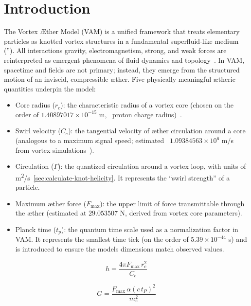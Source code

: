 \section{Introduction}

The Vortex Æther Model (VAM) is a unified framework that treats elementary particles as knotted vortex structures in a fundamental superfluid-like medium (\textquotedblright). All interactions \textendash gravity, electromagnetism, strong, and weak forces \textendash are reinterpreted as emergent phenomena of fluid dynamics and topology~\cite{VAM4}. In VAM, spacetime and fields are not primary; instead, they emerge from the structured motion of an inviscid, compressible æther. Five physically meaningful ætheric quantities underpin the model:

\begin{itemize}
    \item Core radius ($r_c$): the characteristic radius of a vortex core (chosen on the order of $1.40897017 \times 10^{-15}$ m, ~proton charge radius)~\cite{VAM4}.
    \item Swirl velocity ($C_e$): the tangential velocity of æther circulation around a core (analogous to a maximum signal speed; estimated ~$1.09384563 \times 10^6$ m/s from vortex simulations~\cite{VAM4}).
    \item Circulation ($\Gamma$): the quantized circulation around a vortex loop, with units of m\textsuperscript{2}/s~\ref{sec:calculate-knot-helicity}. It represents the ``swirl strength'' of a particle.
    \item Maximum æther force ($F_{\max}$): the upper limit of force transmittable through the æther (estimated at $29.053507$ N, derived from vortex core parameters).
    \item Planck time ($t_p$): the quantum time scale used as a normalization factor in VAM. It represents the smallest time tick (on the order of $5.39\times10^{-44}$ s) and is introduced to ensure the model\rqs s dimensions match observed values.
    \label{sec:coreconstants}
\end{itemize}

\begin{minipage}{0.48\textwidth}
\begin {equation}
        \boxed{h=\frac{4\pi F_{\max }\,r_c^{2}}{C_e}}
    \label{eq:plancks-constants}
\end{equation}
\end{minipage}
\hfill
\begin{minipage}{0.48\textwidth}
\begin {equation}
\boxed{G=\frac{F_{\max}\,\alpha(c\,t_P)^{2}}{m_e^{2}}}
\label{eq:newtons-constants}
\end{equation}
\end{minipage}

